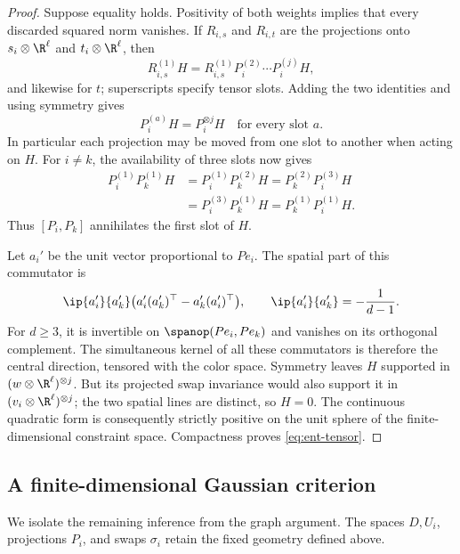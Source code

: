 \begin{proof}
Suppose equality holds. Positivity of both weights implies that
every discarded squared norm vanishes. If \(R_{i,s}\) and
\(R_{i,t}\) are the projections onto
\(s_i\otimes\R^\ell\) and \(t_i\otimes\R^\ell\), then
\[
 R_{i,s}^{(1)}H
 =R_{i,s}^{(1)}P_i^{(2)}\cdots P_i^{(j)}H,
\]
and likewise for \(t\); superscripts specify tensor slots.
Adding the two identities and using symmetry gives
\begin{equation}\label{eq:ent-slot-transfer}
 P_i^{(a)}H=P_i^{\otimes j}H
 \quad\text{for every slot }a.
\end{equation}
In particular each projection may be moved from one slot to
another when acting on \(H\).
For \(i\ne k\), the availability of three slots now gives
\begin{align*}
 P_i^{(1)}P_k^{(1)}H
 &=P_i^{(1)}P_k^{(2)}H
  =P_k^{(2)}P_i^{(3)}H\\
 &=P_i^{(3)}P_k^{(1)}H
  =P_k^{(1)}P_i^{(1)}H .
\end{align*}
Thus \([P_i,P_k]\) annihilates the first slot of \(H\).

Let \(a_i'\) be the unit vector proportional to \(Pe_i\).
The spatial part of this commutator is
\[
 \ip{a_i'}{a_k'}
       \bigl(a_i'(a_k')^\top-a_k'(a_i')^\top\bigr),
 \qquad \ip{a_i'}{a_k'}=-\frac1{d-1}.
\]
For \(d\ge3\), it is invertible on
\(\spanop(Pe_i,Pe_k)\) and vanishes on its orthogonal complement.
The simultaneous kernel of all these commutators is therefore
the central direction, tensored with the color space.
Symmetry leaves \(H\) supported in
\((w\otimes\R^\ell)^{\otimes j}\).
But its projected swap invariance would also support it in
\((v_i\otimes\R^\ell)^{\otimes j}\); the two spatial lines are
distinct, so \(H=0\).
The continuous quadratic form is consequently strictly positive
on the unit sphere of the finite-dimensional constraint space.
Compactness proves \eqref{eq:ent-tensor}.
\end{proof}

\subsection{A finite-dimensional Gaussian criterion}

We isolate the remaining inference from the graph argument. The spaces
\(D,U_i\), projections \(P_i\), and swaps \(\sigma_i\) retain the
fixed geometry defined above.

